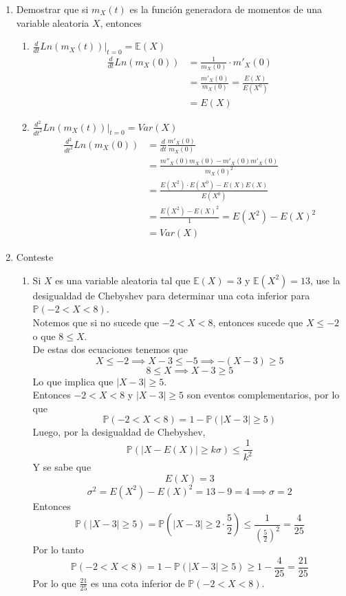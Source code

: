 \documentclass[12pt,a4paper]{report}
\begin{document}
\begin{enumerate}
		\item{
			Demostrar que si $m_X(t)$ es la función generadora de momentos de
			una variable aleatoria $X$, entonces
			\begin{enumerate}
				\item {
				$\frac{d}{dt}Ln(m_X(t))|_{t = 0} = \mathbb{E}(X)$
				\begin{align*}
					\frac{d}{dt}Ln(m_X(0)) &= \frac{1}{m_X(0)} \cdot m'_X(0)\\
					&= \frac{m'_X(0)}{m_X(0)} = \frac{E(X)}{E(X^0)}\\
					&= E(X)
				\end{align*}
				}

				\item {
				$\frac{d^2}{dt^2}Ln(m_X(t))|_{t = 0} = Var(X)$
				\begin{align*}
					\frac{d^2}{dt^2}Ln(m_X(0)) &= \frac{d}{dt}\frac{m'_X(0)}{m_X(0)}\\
					&= \frac{m''_X(0)m_X(0)-m'_X(0)m'_X(0)}{m_X(0)^2}\\
					&= \frac{E(X^2) \cdot E(X^0) - E(X)E(X)}{E(X^0)}\\
					&= \frac{E(X^2)-E(X)^2}{1} = E(X^2)-E(X)^2 \\
					&= Var(X)
				\end{align*}
				}
			\end{enumerate}
		}

		\item{
			Conteste
			\begin{enumerate}
				\item {
					Si $X$ es una variable aleatoria tal que
					$\mathbb{E}(X) = 3$ y $\mathbb{E}(X^2) = 13$, use la
					desigualdad de Chebyshev para determinar una cota inferior
					para $\mathbb{P}(-2 < X < 8)$.\\
					Notemos que si no sucede que $-2 < X < 8$, entonces  sucede que
					$X \leq -2$ o que $8 \leq X$.\\
					De estas dos ecuaciones tenemos que
					\[X \leq -2 \implies X - 3 \leq -5 \implies -(X - 3) \geq 5\]
					\[ 8 \leq X \implies X - 3 \geq 5\]
					Lo que implica que $|X-3| \geq 5$.\\
					Entonces $-2 < X < 8$ y $|X-3| \geq 5$ son eventos
					complementarios, por lo que
					\[\mathbb{P}(-2 < X < 8) = 1 - \mathbb{P}(|X-3| \geq 5)\]
					Luego, por la desigualdad de Chebyshev,
					\[\mathbb{P}(|X-E(X)| \geq k\sigma) \leq \frac{1}{k^2}\]
					Y se sabe que
					\[E(X) = 3\]
					\[\sigma ^2 = E(X^2) - E(X)^2 = 13 - 9 = 4 \implies \sigma = 2\]
					Entonces
					\[\mathbb{P}(|X-3| \geq 5) = \mathbb{P}(|X-3| \geq 2\cdot \frac{5}{2})
					 \leq \frac{1}{(\frac{5}{2})^2} = \frac{4}{25}\]
					Por lo tanto
					\[\mathbb{P}(-2 < X < 8) = 1 - \mathbb{P}(|X-3| \geq 5)
					\geq 1 - \frac{4}{25} = \frac{21}{25}\]
					Por lo que $\frac{21}{25}$ es una cota inferior de
					$\mathbb{P}(-2 < X < 8)$.
				}


\end{enumerate}}
\end{enumerate}
\end{document}
